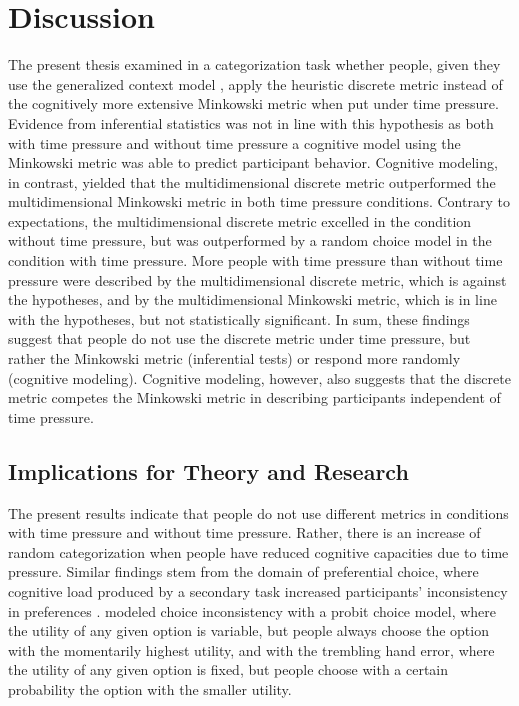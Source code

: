 \documentclass[a4paper,man,natbib]{apa6}
\begin{document}
\section{Discussion}
The present thesis examined in a categorization task whether people, given they use the generalized context model \citep{nosofsky1986attention}, apply the heuristic discrete metric instead of the cognitively more extensive Minkowski metric when put under time pressure. Evidence from inferential statistics was not in line with this hypothesis as both with time pressure and without time pressure a cognitive model using the Minkowski metric was able to predict participant behavior. Cognitive modeling, in contrast, yielded that the multidimensional discrete metric outperformed the multidimensional Minkowski metric in both time pressure conditions. Contrary to expectations, the multidimensional discrete metric excelled in the condition without time pressure, but was outperformed by a random choice model in the condition with time pressure. More people with time pressure than without time pressure were described by the multidimensional discrete metric, which is against the hypotheses, and by the multidimensional Minkowski metric, which is in line with the hypotheses, but not statistically significant. In sum, these findings suggest that people do not use the discrete metric under time pressure, but rather the Minkowski metric (inferential tests) or respond more randomly (cognitive modeling). Cognitive modeling, however, also suggests that the discrete metric competes the Minkowski metric in describing participants independent of time pressure. 

\subsection{Implications for Theory and Research}
The present results indicate that people do not use different metrics in conditions with time pressure and without time pressure. Rather, there is an increase of random categorization when people have reduced cognitive capacities due to time pressure. Similar findings stem from the domain of preferential choice, where cognitive load produced by a secondary task increased participants' inconsistency in preferences \citep{olschewski2018taxing, burks2009cognitive}. 
\cite{olschewski2018taxing} modeled choice inconsistency with a probit choice model, where the utility of any given option is variable, but people always choose the option with the momentarily highest utility, and with the trembling hand error, where the utility of any given option is fixed, but people choose with a certain probability the option with the smaller utility. 
\end{document}
